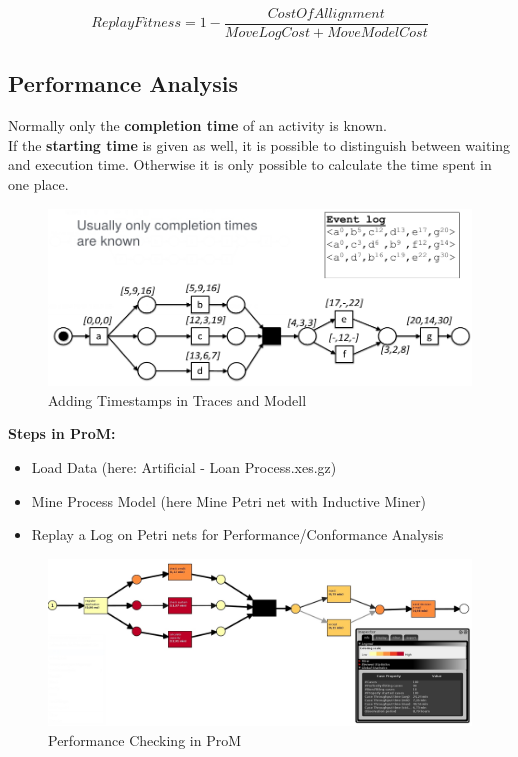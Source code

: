 \begin{framed} \begin{equation}
Replay Fitness = 1 - \frac{Cost Of Allignment}{Move Log Cost + Move Model Cost}
\end{equation} 
\end{framed}


\subsection{Performance Analysis}

Normally only the \textbf{completion time} of an activity is known.\\
If the \textbf{starting time} is given as well, it is possible to distinguish between waiting and execution time. Otherwise it is only possible to calculate the time spent in one place.
\begin{figure} [H]
\includegraphics[width=14cm]{Chapters/Notizen_Graphics/TimestampsInTraces_PerformanceChecks.jpg}
\caption{Adding Timestamps in Traces and Modell} 
\end{figure} 


\textbf{Steps in ProM:}
\begin{itemize}
\item Load Data (here: \glqq Artificial - Loan Process.xes.gz\grqq)
\item Mine Process Model (here \glqq Mine Petri net with Inductive Miner\grqq)
\item \glqq Replay a Log on Petri nets for Performance/Conformance Analysis\grqq

\end{itemize}


\begin{figure} [H]
\includegraphics[width=14cm]{Chapters/Notizen_Graphics/ProM_PerformanceChecking.jpg}
\caption{Performance Checking in ProM} 
\end{figure} 

